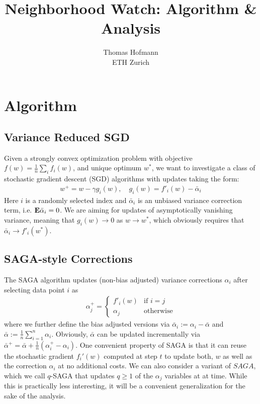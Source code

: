 \documentclass{article}
\title{Neighborhood Watch: Algorithm \&  Analysis}
\author{Thomas Hofmann\\ ETH Zurich}
\newcommand{\E}{{\bf E}}
\begin{document}
\maketitle

\section{Algorithm}

\subsection{Variance Reduced SGD}

Given a strongly convex optimization problem with objective $f(w) = \frac 1n \sum_i f_i(w)$, and unique optimum $w^*$, we want to investigate a class of stochastic gradient descent (SGD) algorithms with updates taking the  form:
\begin{align}
w^+ = w - \gamma g_i(w),  \quad g_i(w)=  f'_i(w) - \bar \alpha_i 
\label{eq:sgd-corrected}
\end{align}
Here  $i$ is a randomly selected index and $\bar\alpha_i$ is an unbiased variance correction term, i.e. $\E \bar\alpha_i = 0$. We are aiming for updates of asymptotically vanishing variance, meaning that $g_i(w) \to 0$ as $w \to w^*$, which obviously requires that $\bar\alpha_i \to f'_i(w^*)$.

\subsection{SAGA-style Corrections}

The SAGA algorithm  updates (non-bias adjusted) variance corrections $\alpha_i$ after selecting data point $i$ as 
\begin{align}
\alpha^+_j  = 
\begin{cases}
f'_i(w) & \text{if $i=j$} \\
\alpha_j & \text{otherwise}
\end{cases}
\end{align} 
where we further define the bias adjusted versions via $\bar\alpha_i := \alpha_i - \bar \alpha$ and $\bar \alpha := \frac 1n \sum_{i=1}^n  \alpha_i$. Obviously, $\bar \alpha$ can be updated incrementally via $\bar \alpha^+ = \bar \alpha + \frac 1n (\alpha_i^+ - \alpha_i)$. One convenient property of SAGA is that it can reuse the stochastic gradient $f_i'(w)$ computed at step $t$ to update both, $w$ as well as the correction $\alpha_i$ at no additional costs. We can also consider a variant of $SAGA$, which we call $q$-SAGA that updates $q \geq 1$ of the $\alpha_j$ variables at at time. While this is practically less interesting, it will be a convenient generalization for the sake of the analysis.
\end{document}
